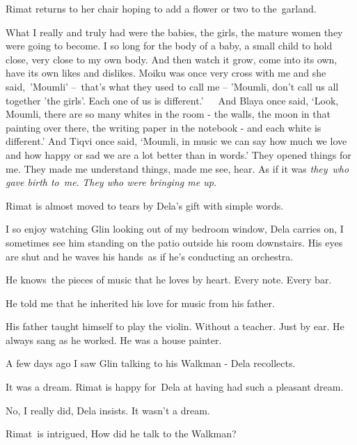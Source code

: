 \documentclass[letterpaper]{article}
\begin{document}
Rimat returns to her chair hoping to add a flower or two to the\ garland.

{\textquotedbl}What I really and truly had were the babies, the girls, the mature women they were going to become. I so
long for the body of a baby, a small child to hold close, very close to my own body. And then watch it grow, come into
its own, have its own likes and dislikes. Moiku was once very cross with me and she said,\ {}'Moumli' --\ that's what
they used to call me -- 'Moumli, don't call us all together 'the girls'. Each one of us is different.'\ \ \ And Blaya
once said, `Look, Moumli, there are so many whites in the room - the walls, the moon in that painting over there, the
writing paper in the notebook - and each white is different.' And Tiqvi once said, `Moumli, in music we can say how
much we love and how happy or sad we are a lot better than in words.' They opened things for me. They made me
understand things, made me see, hear. As if it was \textit{they}\ \textit{who gave birth to}\ \textit{me}.\textit{ They
who were bringing me up.}{\textquotedbl}

Rimat is almost moved to tears by Dela's gift with simple words.

{\textquotedbl}I so enjoy watching Glin looking out of my bedroom window,{\textquotedbl} Dela carries on,
{\textquotedbl}I sometimes see him standing on the patio outside his room downstairs. His eyes are shut and he waves
his hands~as if he's conducting an orchestra.{\textquotedbl} 

{\textquotedbl}He knows\ the pieces of music that he loves by heart. Every note. Every bar.{\textquotedbl}

{\textquotedbl}He told me that he inherited his love for music from his father.{\textquotedbl}

{\textquotedbl}His father taught himself to play the violin. Without a teacher. Just by ear. He always sang as he
worked. He was a house painter.{\textquotedbl}

{\textquotedbl}A few days ago I saw Glin talking to his Walkman -{\textquotedbl} Dela recollects.

{\textquotedbl}It was a dream.{\textquotedbl} Rimat is happy for~Dela at having had such a pleasant dream.

{\textquotedbl}No, I really did,{\textquotedbl} Dela insists. {\textquotedbl}It wasn't a dream.{\textquotedbl}

Rimat~is intrigued, {\textquotedbl}How did he talk to the Walkman?{\textquotedbl}
\end{document}
